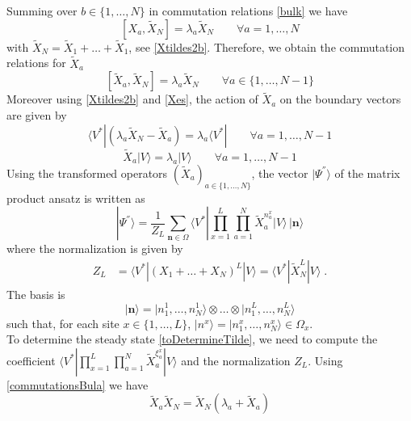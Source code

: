 \documentclass[10pt]{article}
\numberwithin{equation}{section}
\numberwithin{equation}{subsection}
\newcommand{\Xt}{\widetilde{X}}
\newcommand{\dt}{\;.}
\begin{document}
Summing over $b\in \{1,\ldots,N\}$ in commutation relations \eqref{bulk} we have
\begin{equation} 
	\left[X_{a},\Xt_{N}\right]=\lambda_{a}\Xt_{N}\qquad\forall a=1,\ldots,N
\end{equation}
with $\widetilde{X}_{N}=\widetilde{X}_{1}+\ldots+\widetilde{X}_{1}$, see \eqref{Xtildes2b}. 
Therefore, we obtain the commutation relations for $\Xt_{a}$ 
\begin{equation}\label{commutationsBula}
	\left[\Xt_{a},\Xt_{N}\right]=\lambda_{a}\Xt_{N}\qquad \forall a\in \{1,\ldots,N-1\}
\end{equation}
Moreover using \eqref{Xtildes2b} and \eqref{Xes}, the action of $\Xt_{a}$ on the boundary vectors are given by 
\begin{equation}\label{commLEFT}
	\langle V^{*}|\left(\lambda_{a}\Xt_{N}-\Xt_{a}\right)=\lambda_{a}\langle V^{*}|\qquad\forall a=1,\ldots,N-1
\end{equation}
\begin{equation}\label{commRIGHT}
	\Xt_{a} |V\rangle= \lambda_{a}|V\rangle\qquad\forall a=1,\ldots,N-1
\end{equation} 
Using the transformed operators $(\widetilde{X}_{a})_{a\in\{1,\ldots,N\}}$, the vector $|\Psi^{''}\rangle$ of the matrix product ansatz is written as
\begin{equation}\label{toDetermineTilde}
	|\Psi^{''}\rangle = \frac{1}{Z_{L}}\sum_{\bm{n}\in \Omega}\langle V^{*}|\prod_{x=1}^{L}\prod_{a=1}^{N}\widetilde{X}_{a}^{n_{a}^{x}}
	|V \rangle \,|\bm{n}\rangle
\end{equation}
where the normalization is given by 
\begin{align}
		Z_{L}&=\langle V^{*}|(X_{1}+\ldots+X_{N})^{L}|V\rangle=\langle V^{*}|\widetilde{X}_{N}^{L}|V\rangle\dt
\end{align}
The basis is 
$$
|\bm{n}\rangle =|n_{1}^{1},\ldots,n_{N}^{1}\rangle \otimes \ldots\otimes |n_{1}^{L},\ldots,n_{N}^{L}\rangle
$$
such that, for each site $x\in \{1,\ldots,L\}$, $|n^{x}\rangle=|n_{1}^{x},\ldots,n_{N}^{x}\rangle\in \Omega_{x}$. \\
To determine the steady state \eqref{toDetermineTilde}, we need to compute the coefficient $\langle V^{*}|\prod_{x=1}^{L}\prod_{a=1}^{N}\widetilde{X}_{a}^{\xi_{a}^{x}}
|V \rangle$ and the normalization $Z_{L}$. Using \eqref{commutationsBula} we have
\begin{equation}\label{UsefulRelation}
	\widetilde{X}_{a}\widetilde{X}_{N}=\widetilde{X}_{N}\left(\lambda_{a}+\widetilde{X}_{a}\right)
\end{equation}
\end{document}
